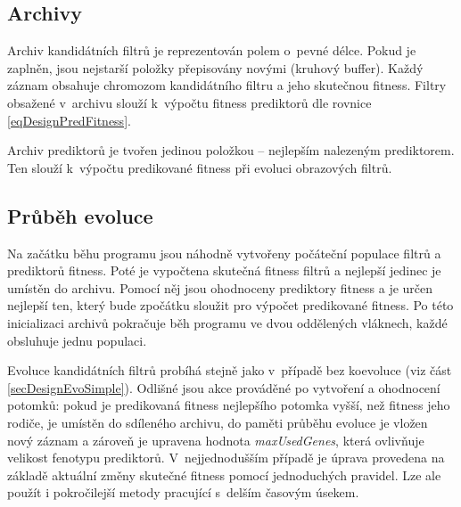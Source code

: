

\subsection{Archivy}

Archiv kandidátních filtrů je reprezentován polem o~pevné délce. Pokud je zaplněn, jsou nejstarší položky přepisovány novými (kruhový buffer). Každý záznam obsahuje chromozom kandidátního filtru a jeho skutečnou fitness. Filtry obsažené v~archivu slouží k~výpočtu fitness prediktorů dle rovnice \ref{eqDesignPredFitness}.

Archiv prediktorů je tvořen jedinou položkou -- nejlepším nalezeným prediktorem. Ten slouží k~výpočtu predikované fitness při evoluci obrazových filtrů.

\subsection{Průběh evoluce}

Na začátku běhu programu jsou náhodně vytvořeny počáteční populace filtrů a prediktorů fitness. Poté je vypočtena skutečná fitness filtrů a nejlepší jedinec je umístěn do archivu. Pomocí něj jsou ohodnoceny prediktory fitness a je určen nejlepší ten, který bude zpočátku sloužit pro výpočet predikované fitness. Po této inicializaci archivů pokračuje běh programu ve dvou oddělených vláknech, každé obsluhuje jednu populaci.

Evoluce kandidátních filtrů probíhá stejně jako v~případě bez koevoluce (viz část \ref{secDesignEvoSimple}). Odlišné jsou akce prováděné po vytvoření a ohodnocení potomků: pokud je predikovaná fitness nejlepšího potomka vyšší, než fitness jeho rodiče, je umístěn do sdíleného archivu, do paměti průběhu evoluce je vložen nový záznam a zároveň je upravena hodnota \emph{maxUsedGenes}, která ovlivňuje velikost fenotypu prediktorů. V~nejjednodušším případě je úprava provedena na základě aktuální změny skutečné fitness pomocí jednoduchých pravidel. Lze ale použít i pokročilejší metody pracující s~delším časovým úsekem.

